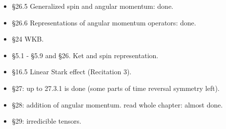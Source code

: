 \begin{itemize}
\item \S 26.5 Generalized spin and angular momentum: done.
\item \S 26.6 Representations of angular momentum operators: done.
\item \S 24 WKB.
\item \S 5.1 - \S 5.9 and \S 26.  Ket and spin representation.
\item \S 16.5 Linear Stark effect (Recitation 3).
\item \S 27: up to 27.3.1 is done (some parts of time reversal symmetry left).
\item \S 28: addition of angular momentum.  read whole chapter:  almost done.
\item \S 29: irredicible tensors.
\end{itemize}
